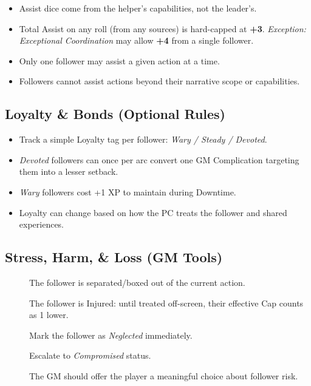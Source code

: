 \begin{itemize}
    \item Assist dice come from the helper's capabilities, not the leader's. 
    \item Total Assist on any roll (from any sources) is hard-capped at \textbf{+3}. \emph{Exception:} \textit{Exceptional Coordination} may allow \textbf{+4} from a single follower. 
    \item Only one follower may assist a given action at a time. 
    \item Followers cannot assist actions beyond their narrative scope or capabilities.
\end{itemize}

\subsection{Loyalty \& Bonds (Optional Rules)}
\label{subsec:follower-loyalty}

\begin{itemize}
    \item Track a simple Loyalty tag per follower: \emph{Wary / Steady / Devoted}. 
    \item \emph{Devoted} followers can once per arc convert one GM Complication targeting them into a lesser setback. 
    \item \emph{Wary} followers cost +1 XP to maintain during Downtime. 
    \item Loyalty can change based on how the PC treats the follower and shared experiences.
\end{itemize}

\subsection{Stress, Harm, \& Loss (GM Tools)}
\label{subsec:follower-stress}

\begin{description}
    \item[] The follower is separated/boxed out of the current action. 
    \item[] The follower is Injured: until treated off-screen, their effective Cap counts as 1 lower. 
    \item[] Mark the follower as \emph{Neglected} immediately. 
    \item[] Escalate to \emph{Compromised} status. 
    \item[] The GM should offer the player a meaningful choice about follower risk. 
\end{description}

